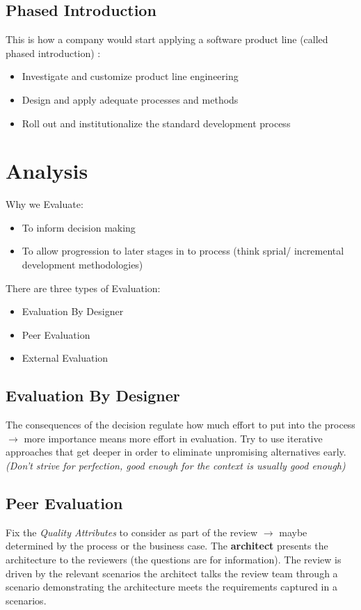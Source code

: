 \documentclass[a4paper]{article}
\begin{document}
\subsection{Phased Introduction}
This is how a company would start applying a software product line (called phased introduction) :
\begin{itemize}
\item Investigate and customize product line engineering
\item Design and apply adequate processes and methods
\item Roll out and institutionalize the standard development process
\end{itemize}

\newpage
\section{Analysis}
Why we Evaluate:
\begin{itemize}
\item To inform decision making
\item To allow progression to later stages in to process (think sprial/ incremental development methodologies)
\end{itemize}

There are three types of Evaluation:
\begin{itemize}
\item Evaluation By Designer
\item Peer Evaluation
\item External Evaluation
\end{itemize}

\subsection{Evaluation By Designer}
The consequences of the decision regulate how much effort to put into the process $\rightarrow$ more importance means more effort in evaluation. Try to use iterative approaches that get deeper in order to eliminate unpromising alternatives early. \textit{(Don't strive for perfection, good enough for the context is usually good enough)}

\subsection{Peer Evaluation}
Fix the \textit{Quality Attributes} to consider as part of the review $\rightarrow$  maybe determined by the process or the business case. The \textbf{architect} presents the architecture to the reviewers (the questions are for information). The review is driven by the relevant scenarios the architect talks the review team through a scenario demonstrating the architecture meets the requirements captured in a scenarios.
\end{document}
